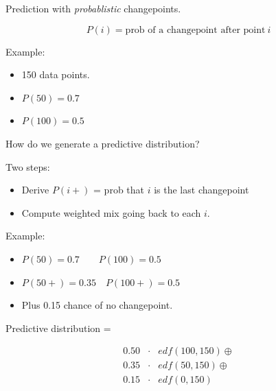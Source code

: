 \documentclass[pdf,allen]{prosper}
\begin{document}
\begin{slide}{}

Prediction with {\em probablistic} changepoints.


\[P(i) = \mbox{prob of a changepoint after point}\ i\]

Example:

\begin{itemize}

\item 150 data points.

\item $P(50) = 0.7$

\item $P(100) = 0.5$

\end{itemize}

How do we generate a predictive distribution?


\end{slide}

\begin{slide}{}

Two steps:

\begin{itemize}

\item Derive $P(i+)$ = prob that $i$ is the last changepoint

\item Compute weighted mix going back to each $i$.

\end{itemize}

Example:

\begin{itemize}

\item $P(50) = 0.7 \quad \quad P(100) = 0.5$

\item $P(50+) = 0.35 \quad P(100+) = 0.5$

\item Plus 0.15 chance of no changepoint.

\end{itemize}

\end{slide}

\begin{slide}{}

Predictive distribution = 

\begin{eqnarray*}
0.50  &\cdot & edf(100, 150) \oplus \\
0.35  &\cdot & edf(50, 150) \oplus \\
0.15 &\cdot & edf(0, 150) \\
\end{eqnarray*}



\end{slide}
\end{document}
